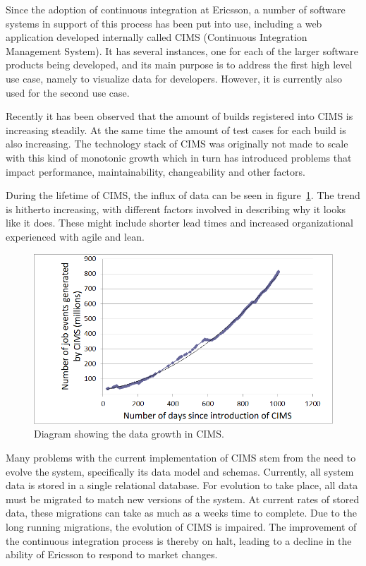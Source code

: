 Since the adoption of continuous integration at Ericsson, a number of software systems in support of this process has been put into use, including a web application developed internally called CIMS (Continuous Integration Management System). It has several instances, one for each of the larger software products being developed, and its main purpose is to address the first high level use case, namely to visualize data for developers. However, it is currently also used for the second use case.

Recently it has been observed that the amount of builds registered into CIMS is increasing steadily. At the same time the amount of test cases for each build is also increasing. The technology stack of CIMS was originally not made to scale with this kind of monotonic growth which in turn has introduced problems that impact performance, maintainability, changeability and other factors.

During the lifetime of CIMS, the influx of data can be seen in figure~\ref{fig:jeTrend}. The trend is hitherto increasing, with different factors involved in describing why it looks like it does. These might include shorter lead times and increased organizational experienced with agile and lean.


\begin{figure}[h!]
\centering
\includegraphics[scale=0.65]{figure/jeTrend.png}
\caption{Diagram showing the data growth in CIMS.}
\label{fig:jeTrend}
\end{figure}

Many problems with the current implementation of CIMS stem from the need to evolve the system, specifically its data model and schemas. Currently, all system data is stored in a single relational database. For evolution to take place, all data must be migrated to match new versions of the system. At current rates of stored data, these migrations can take as much as a weeks time to complete. Due to the long running migrations, the evolution of CIMS is impaired. The improvement of the continuous integration process is thereby on halt, leading to a decline in the ability of Ericsson to respond to market changes.

